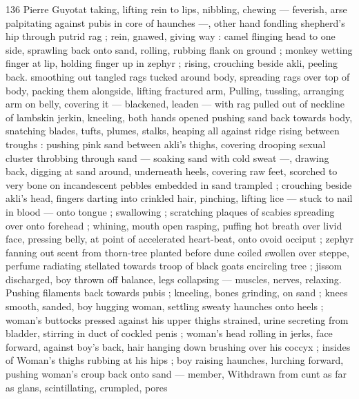 136 Pierre Guyotat
taking, lifting rein to lips, nibbling, chewing — feverish, arse
palpitating against pubis in core of haunches —, other hand
fondling shepherd's hip through putrid rag ; rein, gnawed, giving way
: camel flinging head to one side, sprawling back onto sand, rolling,
rubbing flank on ground ; monkey wetting finger at lip, holding finger
up in zephyr ; rising, crouching beside akli, peeling back. smoothing
out tangled rags tucked around body, spreading rags over top of
body, packing them alongside, lifting fractured arm, Pulling, tussling,
arranging arm on belly, covering it — blackened, leaden — with rag
pulled out of neckline of lambskin jerkin, kneeling, both hands
opened pushing sand back towards body, snatching blades, tufts,
plumes, stalks, heaping all against ridge rising between troughs :
pushing pink sand between akli's thighs, covering drooping sexual
cluster throbbing through sand — soaking sand with cold sweat —,
drawing back, digging at sand around, underneath heels, covering
raw feet, scorched to very bone on incandescent pebbles embedded
in sand trampled ; crouching beside akli's head, fingers darting into
crinkled hair, pinching, lifting lice — stuck to nail in blood — onto
tongue ; swallowing ; scratching plaques of scabies spreading over
onto forehead ; whining, mouth open rasping, puffing hot breath
over livid face, pressing belly, at point of accelerated heart-beat,
onto ovoid occiput ; zephyr fanning out scent from thorn-tree planted
before dune coiled swollen over steppe, perfume radiating stellated
towards troop of black goats encircling tree ; jissom discharged, boy
thrown off balance, legs collapsing — muscles, nerves, relaxing.
Pushing filaments back towards pubis ; kneeling, bones grinding, on
sand ; knees smooth, sanded, boy hugging woman, settling sweaty
haunches onto heels ; woman's buttocks pressed against his upper
thighs strained, urine secreting from bladder, stirring in duct of
cockled penis ; woman's head rolling in jerks, face forward, against
boy's back, hair hanging down brushing over his coccyx ; insides of
Woman's thighs rubbing at his hips ; boy raising haunches, lurching
forward, pushing woman's croup back onto sand — member,
Withdrawn from cunt as far as glans, scintillating, crumpled, pores

